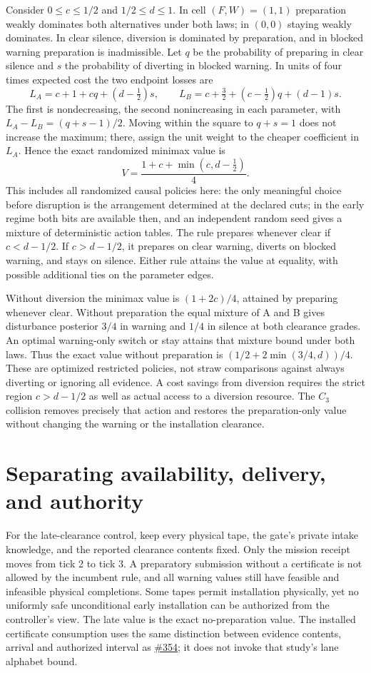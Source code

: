 \documentclass[11pt]{article}
\begin{document}
Consider $0\le c\le 1/2$ and $1/2\le d\le1$. In cell $(F,W)=(1,1)$ preparation weakly dominates both alternatives under both laws; in $(0,0)$ staying weakly dominates. In clear silence, diversion is dominated by preparation, and in blocked warning preparation is inadmissible. Let $q$ be the probability of preparing in clear silence and $s$ the probability of diverting in blocked warning. In units of four times expected cost the two endpoint losses are
\[
 L_A=c+1+cq+(d-\tfrac12)s,\qquad
 L_B=c+\tfrac32+(c-\tfrac12)q+(d-1)s.
\]
The first is nondecreasing, the second nonincreasing in each parameter, with $L_A-L_B=(q+s-1)/2$. Moving within the square to $q+s=1$ does not increase the maximum; there, assign the unit weight to the cheaper coefficient in $L_A$. Hence the exact randomized minimax value is
\[
 V=\frac{1+c+\min(c,d-\tfrac12)}4.
\]
This includes all randomized causal policies here: the only meaningful choice before disruption is the arrangement determined at the declared cuts; in the early regime both bits are available then, and an independent random seed gives a mixture of deterministic action tables. The rule prepares whenever clear if $c<d-1/2$. If $c>d-1/2$, it prepares on clear warning, diverts on blocked warning, and stays on silence. Either rule attains the value at equality, with possible additional ties on the parameter edges.

Without diversion the minimax value is $(1+2c)/4$, attained by preparing whenever clear. Without preparation the equal mixture of A and B gives disturbance posterior $3/4$ in warning and $1/4$ in silence at both clearance grades. An optimal warning-only switch or stay attains that mixture bound under both laws. Thus the exact value without preparation is $(1/2+2\min(3/4,d))/4$. These are optimized restricted policies, not straw comparisons against always diverting or ignoring all evidence. A cost savings from diversion requires the strict region $c>d-1/2$ as well as actual access to a diversion resource. The $C_3$ collision removes precisely that action and restores the preparation-only value without changing the warning or the installation clearance.

\section{Separating availability, delivery, and authority}
For the late-clearance control, keep every physical tape, the gate's private intake knowledge, and the reported clearance contents fixed. Only the mission receipt moves from tick 2 to tick 3. A preparatory submission without a certificate is not allowed by the incumbent rule, and all warning values still have feasible and infeasible physical completions. Some tapes permit installation physically, yet no uniformly safe unconditional early installation can be authorized from the controller's view. The late value is the exact no-preparation value. The installed certificate consumption uses the same distinction between evidence contents, arrival and authorized interval as \href{https://github.com/eternal-november/eos-research-programmes/pull/354}{\#354}; it does not invoke that study's lane alphabet bound.
\end{document}

